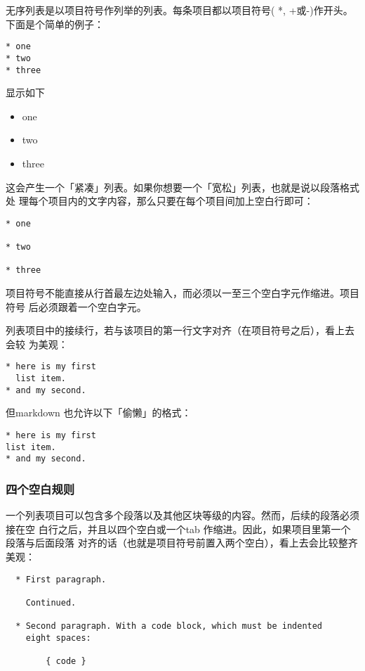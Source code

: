 \documentclass[cn]{elegantbook}
\providecommand{\tightlist}{%
  \setlength{\itemsep}{0pt}\setlength{\parskip}{0pt}}
\begin{document}
无序列表是以项目符号作列举的列表。每条项目都以项目符号( *, +或-)作开头。
下面是个简单的例子：

\begin{lstlisting}
* one
* two
* three
\end{lstlisting}

显示如下

\begin{itemize}
\tightlist
\item
  one
\item
  two
\item
  three
\end{itemize}

这会产生一个「紧凑」列表。如果你想要一个「宽松」列表，也就是说以段落格式处
理每个项目内的文字内容，那么只要在每个项目间加上空白行即可：

\begin{lstlisting}
* one

* two

* three
\end{lstlisting}

项目符号不能直接从行首最左边处输入，而必须以一至三个空白字元作缩进。项目符号
后必须跟着一个空白字元。

列表项目中的接续行，若与该项目的第一行文字对齐（在项目符号之后），看上去会较
为美观：

\begin{lstlisting}
* here is my first
  list item.
* and my second.
\end{lstlisting}

但markdown 也允许以下「偷懒」的格式：

\begin{lstlisting}
* here is my first
list item.
* and my second.
\end{lstlisting}

\hypertarget{ux56dbux4e2aux7a7aux767dux89c4ux5219}{%
\subsubsection{四个空白规则}\label{ux56dbux4e2aux7a7aux767dux89c4ux5219}}

一个列表项目可以包含多个段落以及其他区块等级的内容。然而，后续的段落必须接在空
白行之后，并且以四个空白或一个tab
作缩进。因此，如果项目里第一个段落与后面段落
对齐的话（也就是项目符号前置入两个空白），看上去会比较整齐美观：

\begin{lstlisting}
  * First paragraph.

    Continued.

  * Second paragraph. With a code block, which must be indented
    eight spaces:

        { code }
\end{lstlisting}
\end{document}
